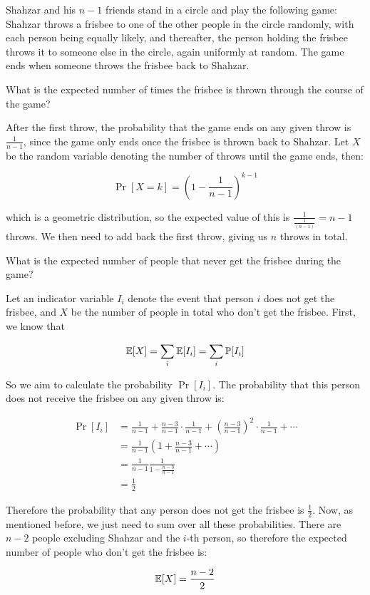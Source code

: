 \documentclass[11pt]{article}
\begin{document}
\pagebreak 


Shahzar and his $n-1$ friends stand in a circle and play the following game: Shahzar throws a frisbee to one of the other people in the circle randomly, with each person being equally likely, and thereafter, the person holding the frisbee throws it to someone else in the circle, again uniformly at random. The game ends when someone throws the frisbee back to Shahzar.

\begin{Parts}

\Part What is the expected number of times the frisbee is thrown through the course of the game?

\begin{solution}
	After the first throw, the probability that the game ends on any given throw is $\frac{1}{n-1}$, since the game only ends once the frisbee is thrown back to Shahzar. Let $X$ be the random variable denoting the number of throws until the game ends, then:

	\[ \Pr[X = k] = \left(1 - \frac{1}{n-1}\right)^{k-1}\]

	which is a geometric distribution, so the expected value of this is $\frac{1}{\frac{1}{(n-1)}} = n-1$ throws. We then need to add back the first throw, giving us $n$ throws in total.
\end{solution}

\Part What is the expected number of people that never get the frisbee during the game?

\begin{solution}
	Let an indicator variable $I_i$ denote the event that person $i$ does not get the frisbee, and $X$ be the number of people in total who don't get the frisbee. First, we know that 
	
	\[ \operatorname{\mathbb{E}}[X] = \sum_i \operatorname{\mathbb{E}}[I_i] = \sum_i \mathbb{P}[I_i]\]

	So we aim to calculate the probability $\Pr[I_i]$. The probability that this person does not receive the frisbee on any given throw is: 

	\begin{align*}
		\Pr[I_i] &= \frac{1}{n-1} + \frac{n - 3}{n-1}\cdot \frac{1}{n-1} + \left(\frac{n - 3}{n-1}\right)^2 \cdot \frac{1}{n-1} + \cdots\\
		&= \frac{1}{n-1}\left( 1 + \frac{n-3}{n-1} + \cdots \right)\\
		&= \frac{1}{n-1} \frac{1}{1 - \frac{n-3}{n-1}}\\
		&= \frac{1}{2}
	\end{align*}

	Therefore the probability that any person does not get the frisbee is $\frac{1}{2}$. Now, as mentioned before, we just need to sum over all these probabilities. There are $n-2$ people excluding Shahzar and the $i$-th person, so therefore the expected number of people who don't get the frisbee is:

	\[ \operatorname{\mathbb{E}}[X] = \frac{n-2}{2}\]
\end{solution}

\end{Parts}
\end{document}
